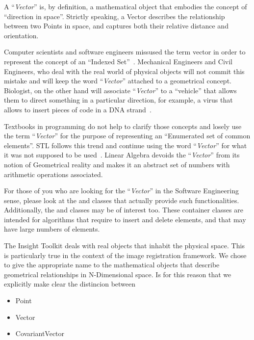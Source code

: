A ``\emph{Vector}'' is, by definition, a mathematical object that embodies the
concept of ``direction in space''. Strictly speaking, a Vector describes the
relationship between two Points in space, and captures both their relative
distance and orientation.

Computer scientists and software engineers missused the term vector in order to
represent the concept of an ``Indexed Set''~\cite{Austern1999}.  Mechanical
Engineers and Civil Engineers, who deal with the real world of physical objects
will not commit this mistake and will keep the word ``\emph{Vector}'' attached
to a geometrical concept.  Biologist, on the other hand will associate
``\emph{Vector}'' to a ``vehicle'' that allows them to direct something in a
particular direction, for example, a virus that allows to insert pieces of code
in a DNA strand~\cite{Lodish2000}.

Textbooks in programming do not help to clarify those concepts and losely use
the term ``\emph{Vector}'' for the purpose of representing an ``Enumerated set
of common elements''. STL follows this trend and continue using the word
``\emph{Vector}'' for what it was not supposed to be
used~\cite{Austern1999,Alexandrescu2001}. Linear Algebra devoids the
``\emph{Vector}'' from its notion of Geometrical reality and makes it an
abstract set of numbers with arithmetic operations associated.

For those of you who are looking for the ``\emph{Vector}'' in the Software
Engineering sense, please look at the  and 
classes that actually provide such functionalities. Additionally, the
 and  classes may be of interest
too. These container classes are intended for algorithms that require to insert
and delete elements, and that may have large numbers of elements.

The Insight Toolkit deals with real objects that inhabit the physical space.
This is particularly true in the context of the image registration framework.
We chose to give the appropriate name to the mathematical objects that describe
geometrical relationships in N-Dimensional space. Is for this reason that we
explicitly make clear the distincion between

\begin{itemize}
\item Point
\item Vector
\item CovariantVector
\end{itemize}

